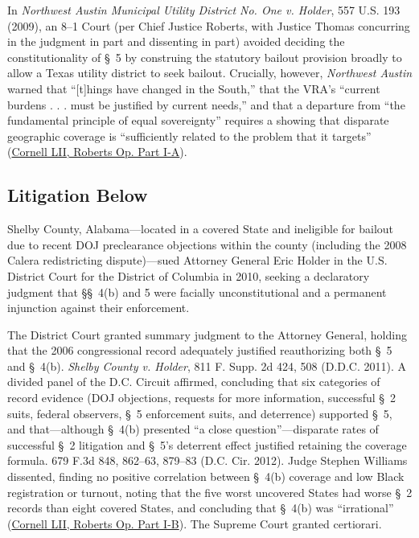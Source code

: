 \documentclass[12pt]{article}
\begin{document}
In \emph{Northwest Austin Municipal Utility District No. One v. Holder}, 557 U.S. 193 (2009), an 8--1 Court (per Chief Justice Roberts, with Justice Thomas concurring in the judgment in part and dissenting in part) avoided deciding the constitutionality of \S~5 by construing the statutory bailout provision broadly to allow a Texas utility district to seek bailout. Crucially, however, \emph{Northwest Austin} warned that ``[t]hings have changed in the South,'' that the VRA's ``current burdens . . . must be justified by current needs,'' and that a departure from ``the fundamental principle of equal sovereignty'' requires a showing that disparate geographic coverage is ``sufficiently related to the problem that it targets'' (\href{https://www.law.cornell.edu/supremecourt/text/12-96}{Cornell LII, Roberts Op. Part I-A}).

\subsection{Litigation Below}
Shelby County, Alabama---located in a covered State and ineligible for bailout due to recent DOJ preclearance objections within the county (including the 2008 Calera redistricting dispute)---sued Attorney General Eric Holder in the U.S. District Court for the District of Columbia in 2010, seeking a declaratory judgment that \S\S~4(b) and 5 were facially unconstitutional and a permanent injunction against their enforcement.

The District Court granted summary judgment to the Attorney General, holding that the 2006 congressional record adequately justified reauthorizing both \S~5 and \S~4(b). \emph{Shelby County v. Holder}, 811 F. Supp. 2d 424, 508 (D.D.C. 2011). A divided panel of the D.C. Circuit affirmed, concluding that six categories of record evidence (DOJ objections, requests for more information, successful \S~2 suits, federal observers, \S~5 enforcement suits, and deterrence) supported \S~5, and that---although \S~4(b) presented ``a close question''---disparate rates of successful \S~2 litigation and \S~5's deterrent effect justified retaining the coverage formula. 679 F.3d 848, 862--63, 879--83 (D.C. Cir. 2012). Judge Stephen Williams dissented, finding no positive correlation between \S~4(b) coverage and low Black registration or turnout, noting that the five worst uncovered States had worse \S~2 records than eight covered States, and concluding that \S~4(b) was ``irrational'' (\href{https://www.law.cornell.edu/supremecourt/text/12-96}{Cornell LII, Roberts Op. Part I-B}). The Supreme Court granted certiorari.
\end{document}
